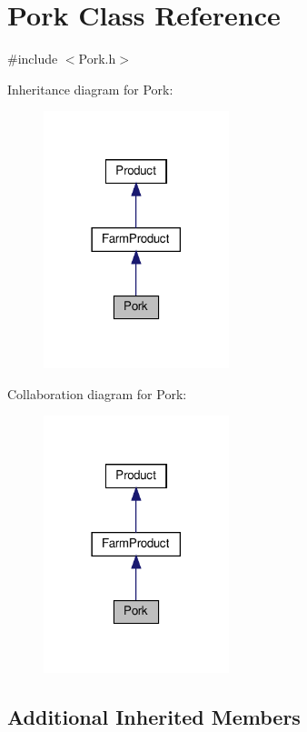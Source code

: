 \hypertarget{classPork}{}\section{Pork Class Reference}
\label{classPork}


{\ttfamily \#include $<$Pork.\+h$>$}



Inheritance diagram for Pork\+:
\nopagebreak
\begin{figure}[H]
\begin{center}
\leavevmode
\includegraphics[width=153pt]{classPork__inherit__graph}
\end{center}
\end{figure}


Collaboration diagram for Pork\+:
\nopagebreak
\begin{figure}[H]
\begin{center}
\leavevmode
\includegraphics[width=153pt]{classPork__coll__graph}
\end{center}
\end{figure}
\subsection*{Additional Inherited Members}


